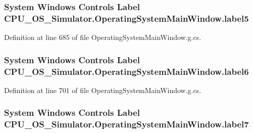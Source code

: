 \subsubsection[{label5}]{\setlength{\rightskip}{0pt plus 5cm}System Windows Controls Label C\+P\+U\+\_\+\+O\+S\+\_\+\+Simulator.\+Operating\+System\+Main\+Window.\+label5\hspace{0.3cm}{\ttfamily [package]}}\label{class_c_p_u___o_s___simulator_1_1_operating_system_main_window_a2b7721f6cfb0a1eeb4a0aec34ef543c0}


Definition at line 685 of file Operating\+System\+Main\+Window.\+g.\+cs.

\hypertarget{class_c_p_u___o_s___simulator_1_1_operating_system_main_window_ad753667e4d67f79b83e59dc8be4df684}{}
\subsubsection[{label6}]{\setlength{\rightskip}{0pt plus 5cm}System Windows Controls Label C\+P\+U\+\_\+\+O\+S\+\_\+\+Simulator.\+Operating\+System\+Main\+Window.\+label6\hspace{0.3cm}{\ttfamily [package]}}\label{class_c_p_u___o_s___simulator_1_1_operating_system_main_window_ad753667e4d67f79b83e59dc8be4df684}


Definition at line 701 of file Operating\+System\+Main\+Window.\+g.\+cs.

\hypertarget{class_c_p_u___o_s___simulator_1_1_operating_system_main_window_ae841fdcc76cc96944b0463f3c4c448a4}{}
\subsubsection[{label7}]{\setlength{\rightskip}{0pt plus 5cm}System Windows Controls Label C\+P\+U\+\_\+\+O\+S\+\_\+\+Simulator.\+Operating\+System\+Main\+Window.\+label7\hspace{0.3cm}{\ttfamily [package]}}\label{class_c_p_u___o_s___simulator_1_1_operating_system_main_window_ae841fdcc76cc96944b0463f3c4c448a4}


